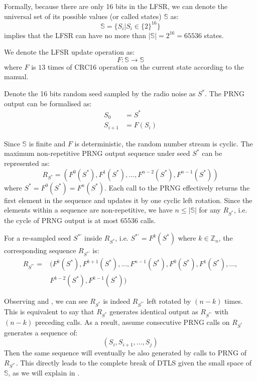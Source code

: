 Formally, because there are only 16 bits in the LFSR, we can denote the universal set of its  possible values (or called states) $\mathbb{S}$ as:
\begin{equation} \label{PRNGState}
\mathbb{S} = \{ S_{i} | S_{i} \in \{2\}^{16}\}
\end{equation}
 implies that the LFSR can have no more than $|\mathbb{S}| = 2^{16} = 65536$ states.

We denote the LFSR update operation as:
\begin{equation}
F:\mathbb{S} \rightarrow \mathbb{S}
\end{equation}
where $F$ is $13$ times of CRC16 operation on the current state according to the manual.

Denote the 16 bits random seed sampled by the radio noise as $S^*$. The PRNG output can be formalised as:
\begin{equation}
	\begin{aligned}
	S_{0} &= S^* \\
	S_{i+1} &= F(S_{i})
	\end{aligned}
\end{equation}

Since $\mathbb{S}$ is finite and $F$ is deterministic, the random number stream is cyclic. The maximum non-repetitive PRNG output sequence under seed $S^*$ can be represented as:
\begin{equation} \label{R*}
R_{S^*}= (F^0(S^{*}), F^{1}(S^{*}), ..., F^{n-2}(S^{*}), F^{n-1}(S^{*}))
\end{equation}
where $S^{*} = F^{0}(S^{*}) = F^{n}(S^{*})$. Each call to the PRNG effectively returns the first element in the sequence and updates it by one cyclic left rotation. Since the elements within a sequence are non-repetitive, we have $n \leq |\mathbb{S}|$ for any $R_{S^*}$, i.e. the cycle of PRNG output is at most $65536$ calls.

For a re-sampled seed $S^{*'}$ inside $R_{S^*}$, i.e. $S^{*'} = F^{k}(S^*)$ where $k \in \mathbb{Z}_n$, the corresponding sequence $R_{S^{*'}}$ is:
\begin{equation}\label{R*'}
	\begin{aligned}
	R_{S^{*'}} = &( F^{k}(S^*), F^{k+1}(S^{*}), ..., F^{n-1}(S^*), F^{0}(S^*), F^{1}(S^*),...,\\
	&F^{k-2}(S^{*}), F^{k-1}(S^{*}))
	\end{aligned}
\end{equation}

Observing  and , we can see $R_{S^*}$ is indeed $R_{S^{*'}}$ left rotated by $(n-k)$ times. This is equivalent to say that $R_{S^*}$ generates identical output as $R_{S^{*'}}$ with $(n-k)$ preceding calls. As a result, assume consecutive PRNG calls on $R_{S^*}$ generates a sequence of:
\begin{equation*}
(S_i, S_{i+1}, ..., S_{j})
\end{equation*}
Then the same sequence will eventually be also generated by calls to PRNG of $R_{S^{*'}}$. This directly leads to the complete break of DTLS given the small space of $\mathbb{S}$, as we will explain in .

